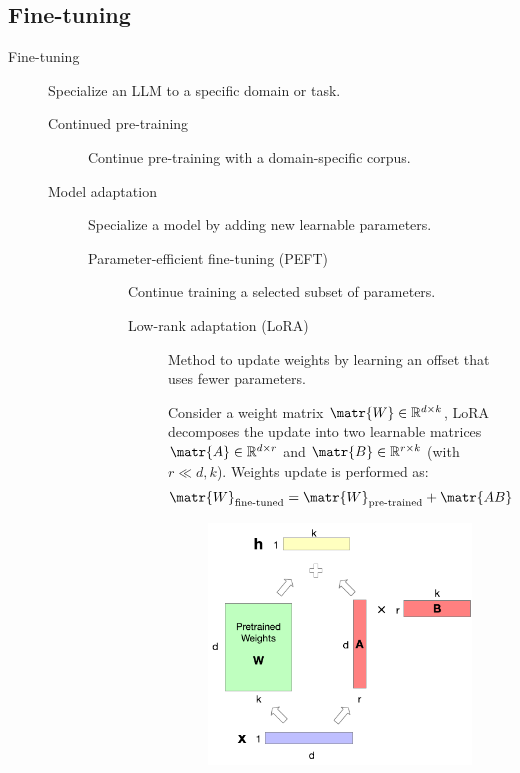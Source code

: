 \subsection{Fine-tuning}

\begin{description}
    \item[Fine-tuning] 
        Specialize an LLM to a specific domain or task.

        \begin{description}
            \item[Continued pre-training] 
                Continue pre-training with a domain-specific corpus.

            \item[Model adaptation]
                Specialize a model by adding new learnable parameters.

                \begin{description}
                    \item[Parameter-efficient fine-tuning (PEFT)] 
                        Continue training a selected subset of parameters.

                        \begin{description}
                            \item[Low-rank adaptation (LoRA)] 
                                Method to update weights by learning an offset that uses fewer parameters.

                                Consider a weight matrix $\matr{W} \in \mathbb{R}^{d \times k}$, LoRA decomposes the update into two learnable matrices $\matr{A} \in \mathbb{R}^{d \times r}$ and $\matr{B} \in \mathbb{R}^{r \times k}$ (with $r \ll d, k$). Weights update is performed as:
                                \[ \matr{W}_{\text{fine-tuned}} = \matr{W}_{\text{pre-trained}} + \matr{AB} \]

                                \begin{figure}[H]
                                    \centering
                                    \includegraphics[width=0.35\linewidth]{./img/_lora.pdf}
                                \end{figure}
                        \end{description}


\end{description}
\end{description}
\end{description}
